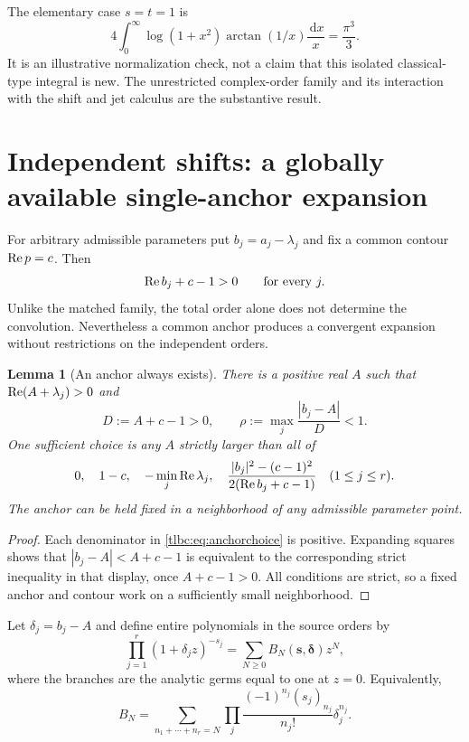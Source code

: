 \documentclass[11pt,letterpaper]{article}
\numberwithin{equation}{section}
\newtheorem{lemma}[theorem]{Lemma}
\theoremstyle{definition}\newtheorem{definition}[theorem]{Definition}
\theoremstyle{remark}\newtheorem{remark}[theorem]{Remark}
\newcommand{\dd}{\,\mathrm d}\newcommand{\ii}{\mathrm i}
\newcommand{\bs}{\boldsymbol s}\newcommand{\ba}{\boldsymbol a}\newcommand{\bl}{\boldsymbol\lambda}
\newcommand{\bd}{\boldsymbol\delta}\newcommand{\bk}{\boldsymbol k}
\begin{document}
The elementary case $s=t=1$ is
\begin{equation}\label{tlbc:eq:elementary}
 4\int_0^\infty\log(1+x^2)\arctan(1/x)\frac{\dd x}{x}
 =\frac{\pi^3}{3}.
\end{equation}
It is an illustrative normalization check, not a claim that this isolated classical-type integral is new. The unrestricted complex-order family and its interaction with the shift and jet calculus are the substantive result.

\section{Independent shifts: a globally available single-anchor expansion}
\label{tlbc:sec:anchor}
For arbitrary admissible parameters put $b_j=a_j-\lambda_j$ and fix a common contour $\operatorname{Re} p=c$. Then
\[
 \operatorname{Re} b_j+c-1>0\qquad\text{for every }j.
\]
Unlike the matched family, the total order alone does not determine the convolution. Nevertheless a common anchor produces a convergent expansion without restrictions on the independent orders.

\begin{lemma}[An anchor always exists]\label{tlbc:lem:anchor}
There is a positive real $A$ such that $\operatorname{Re}(A+\lambda_j)>0$ and
\begin{equation}\label{tlbc:eq:anchorcondition}
 D:=A+c-1>0,\qquad
 \rho:=\max_j\frac{|b_j-A|}{D}<1.
\end{equation}
One sufficient choice is any $A$ strictly larger than all of
\begin{equation}\label{tlbc:eq:anchorchoice}
 0,\quad 1-c,\quad-\min_j\operatorname{Re}\lambda_j,\quad
 \frac{|b_j|^2-(c-1)^2}{2(\operatorname{Re} b_j+c-1)}\quad(1\le j\le r).
\end{equation}
The anchor can be held fixed in a neighborhood of any admissible parameter point.
\end{lemma}
\begin{proof}
Each denominator in \eqref{tlbc:eq:anchorchoice} is positive. Expanding squares shows that $|b_j-A|<A+c-1$ is equivalent to the corresponding strict inequality in that display, once $A+c-1>0$. All conditions are strict, so a fixed anchor and contour work on a sufficiently small neighborhood.
\end{proof}

Let $\delta_j=b_j-A$ and define entire polynomials in the source orders by
\begin{equation}\label{tlbc:eq:Bdef}
 \prod_{j=1}^r(1+\delta_jz)^{-s_j}
 =\sum_{N\ge0}B_N(\bs,\bd)z^N,
\end{equation}
where the branches are the analytic germs equal to one at $z=0$. Equivalently,
\begin{equation}\label{tlbc:eq:Bmulti}
 B_N=\sum_{n_1+\cdots+n_r=N}
       \prod_j\frac{(-1)^{n_j}(s_j)_{n_j}}{n_j!}\delta_j^{n_j}.
\end{equation}
\end{document}
